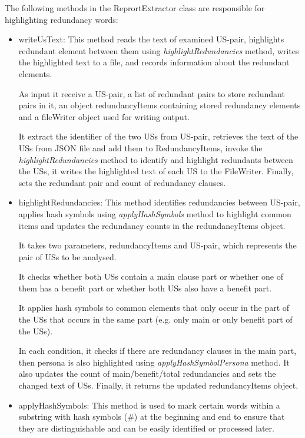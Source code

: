 The following methods in the ReprortExtractor class are responsible for highlighting redundancy words:
\begin{itemize}
	\item writeUsText: This method reads the text of examined US-pair, highlights redundant element between them using \textit{highlightRedundancies} method, writes the highlighted text to a file, and records information about the redundant elements. 
	
	As input it receive a US-pair, a list of redundant pairs to store redundant pairs in it, an object redundancyItems containing stored redundancy elements and a fileWriter object used for writing output.
	
	It extract the identifier of the two USs from US-pair, retrieves the text of the USs from JSON file and add them to RedundancyItems, invoke the \textit{highlightRedundancies} method to identify and highlight redundants between the USs, it writes the highlighted text of each US to the FileWriter. Finally, sets the redundant pair and count of redundancy clauses.
	\item highlightRedundancies: This method identifies redundancies between US-pair, applies hash symbols using \textit{applyHashSymbols} method to highlight common items and updates the redundancy counts in the redundancyItems object. 
	
	It takes two parameters, redundancyItems and US-pair, which represents the pair of USs to be analysed. 
	
	It checks whether both USs contain a main clause part or whether one of them has a benefit part or whether both USs also have a benefit part.
	
	It applies hash symbols to common elements that only occur in the part of the USs that occurs in the same part (e.g. only main or only benefit part of the USs). 
	
	In each condition, it checks if there are redundancy clauses in the main part, then persona is also highlighted using \textit{applyHashSymbolPersona} method. It also updates the count of main/benefit/total redundancies and sets the changed text of USs. Finally, it returns the updated redundancyItems object.
	\item applyHashSymbols: This method is used to mark certain words within a substring with hash symbols (\#) at the beginning and end to ensure that they are distinguishable and can be easily identified or processed later. 
	

\end{itemize}
